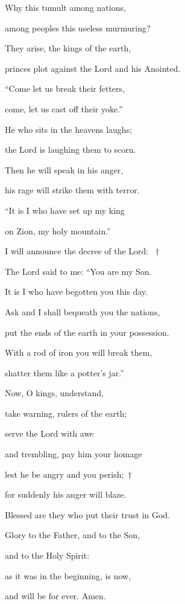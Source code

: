 \noindent Why this tumult among nations,~\GreStar{}~\nopagebreak

among peoples this useless murmuring?

\noindent They arise, the kings of the earth,~\GreStar{}~\nopagebreak

princes plot against the Lord and his Anointed.

\noindent “Come let us break their fetters,~\GreStar{}~\nopagebreak

come, let us cast off their yoke.”

\noindent He who sits in the heavens laughs;~\GreStar{}~\nopagebreak

the Lord is laughing them to scorn.

\noindent Then he will speak in his anger,~\GreStar{}~\nopagebreak

his rage will strike them with terror.

\noindent “It is I who have set up my king~\GreStar{}~\nopagebreak

on Zion, my holy mountain.”

\noindent I will announce the decree of the Lord: ~†~\nopagebreak

The Lord said to me: “You are my Son.~\GreStar{}~\nopagebreak

It is I who have begotten you this day.

\noindent Ask and I shall bequeath you the nations,~\GreStar{}~\nopagebreak

put the ends of the earth in your possession.

\noindent With a rod of iron you will break them,~\GreStar{}~\nopagebreak

shatter them like a potter’s jar.”

\noindent Now, O kings, understand,~\GreStar{}~\nopagebreak

take warning, rulers of the earth;

\noindent serve the Lord with awe~\GreStar{}~\nopagebreak

and trembling, pay him your homage

\noindent lest he be angry and you perish;~†~\nopagebreak

for suddenly his anger will blaze.~\GreStar{}~\nopagebreak

Blessed are they who put their trust in God.

\noindent Glory to the Father, and to the Son,~\GreStar{}~\nopagebreak

and to the Holy Spirit:

\noindent as it was in the beginning, is now,~\GreStar{}~\nopagebreak

and will be for ever. Amen.

